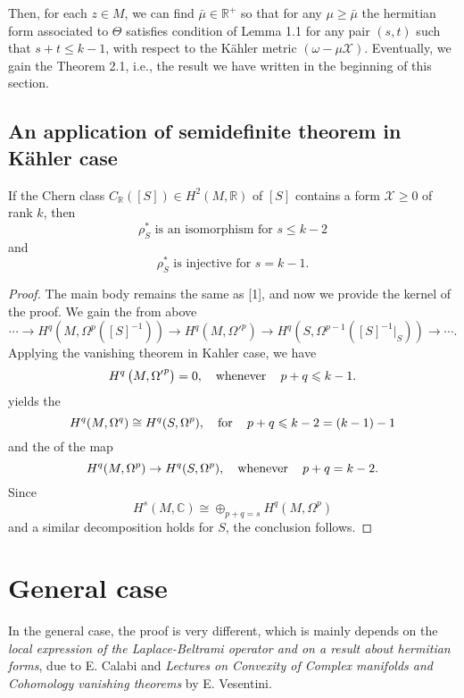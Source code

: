 \documentclass[lang=en,12pt]{beautybook}
\begin{document}
Then, for each $z \in M$, we can find $\bar{\mu} \in \mathbb{R}^+$ so
that for any $\mu \geqslant \bar{\mu}$ the hermitian form associated to
$\Theta$ satisfies condition of Lemma 1.1 for any pair $(s, t)$ such that $s +
t \leqslant k - 1$, with respect to the K\"ahler metric $(\omega - \mu
\mathcal{X})$.  Eventually, we gain the Theorem 2.1, i.e., the result we have written in the beginning of this section.

\subsection{An application of semidefinite theorem in K\"ahler case}

\begin{theorem}
  If the Chern class $C_{\mathbb{R}} ([S]) \in H^2 (M, \mathbb{R})$ of $[S]$
  contains a form $\mathcal{X} \geqslant 0$ of rank $k$, then
  \[ \rho^{\ast}_S  \text{ is an isomorphism for $s \leqslant k - 2$} \]
  and
  \[ \rho^{\ast}_S \text{ is injective for $s = k - 1$.} \]
\end{theorem}

\begin{proof}
  The main body remains the same as [1], and now we provide the kernel of the
  proof. We gain the {} from above
  \[ \cdots \rightarrow H^q (M, \Omega^p ([S]^{- 1})) \rightarrow H^q \left(
     {M, \Omega'}^p \right) \rightarrow H^q (S, \Omega^{p - 1} ([S]^{- 1} |_S
    )) \rightarrow \cdots . \]
  Applying the vanishing theorem in Kahler case, we have
  \[ H^q \left( {M, \Omega'}^p \right) = 0, \quad \operatorname{whenever} \quad p + q
     \leqslant k - 1. \]
  {} yields the
  {}
  \begin{equation}
    H^q (M, \Omega^q) \cong H^q (S, \Omega^p), \quad \operatorname{for} \quad p + q
    \leqslant k - 2 = (k - 1) - 1 \label{5}
  \end{equation}
  and the {} of the map
  \[ H^q (M, \Omega^p) \rightarrow H^q (S, \Omega^p), \quad \operatorname{whenever}
     \quad p + q = k - 2. \]
  Since
  \[ H^s (M, \mathbb{C}) \cong \oplus_{p + q = s} H^q (M, \Omega^p) \]
  and a similar decomposition holds for $S$, the conclusion follows.
\end{proof}

\section{General case}
In the general case, the proof is very different, which is mainly depends on the \textit{local expression of the Laplace-Beltrami operator and on a result about hermitian forms}, due to E. Calabi and \textit{Lectures on Convexity of Complex manifolds and Cohomology vanishing theorems} by E. Vesentini.
\end{document}
